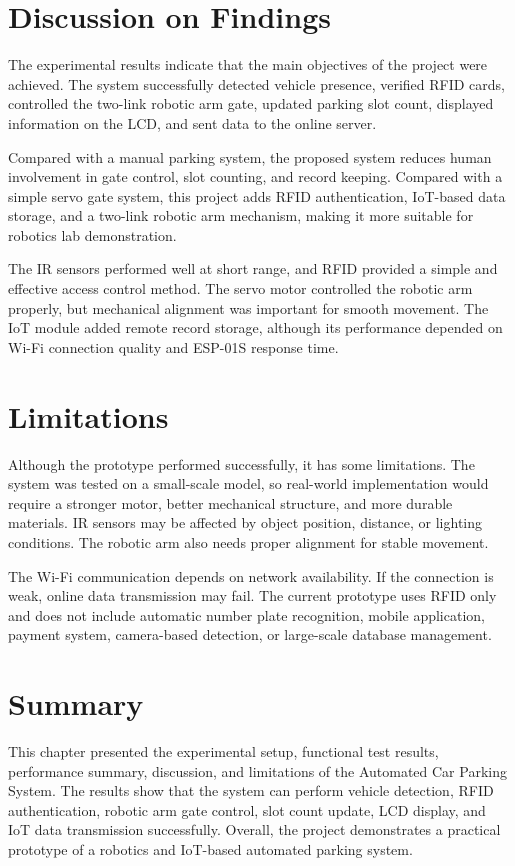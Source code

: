 \section{Discussion on Findings}

The experimental results indicate that the main objectives of the project were achieved. The system successfully detected vehicle presence, verified RFID cards, controlled the two-link robotic arm gate, updated parking slot count, displayed information on the LCD, and sent data to the online server.

Compared with a manual parking system, the proposed system reduces human involvement in gate control, slot counting, and record keeping. Compared with a simple servo gate system, this project adds RFID authentication, IoT-based data storage, and a two-link robotic arm mechanism, making it more suitable for robotics lab demonstration.

The IR sensors performed well at short range, and RFID provided a simple and effective access control method. The servo motor controlled the robotic arm properly, but mechanical alignment was important for smooth movement. The IoT module added remote record storage, although its performance depended on Wi-Fi connection quality and ESP-01S response time.

\section{Limitations}

Although the prototype performed successfully, it has some limitations. The system was tested on a small-scale model, so real-world implementation would require a stronger motor, better mechanical structure, and more durable materials. IR sensors may be affected by object position, distance, or lighting conditions. The robotic arm also needs proper alignment for stable movement.

The Wi-Fi communication depends on network availability. If the connection is weak, online data transmission may fail. The current prototype uses RFID only and does not include automatic number plate recognition, mobile application, payment system, camera-based detection, or large-scale database management.

\section{Summary}

This chapter presented the experimental setup, functional test results, performance summary, discussion, and limitations of the Automated Car Parking System. The results show that the system can perform vehicle detection, RFID authentication, robotic arm gate control, slot count update, LCD display, and IoT data transmission successfully. Overall, the project demonstrates a practical prototype of a robotics and IoT-based automated parking system.

